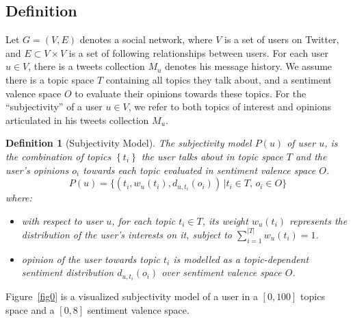 \documentclass[letterpaper]{article}
\newtheorem{definition}{Definition}
\begin{document}
\subsection{Definition}
\label{definition}

Let $G=\left( V,E \right) $ denotes a social network, where $ V $ is a set of users on Twitter, and $ E\subset V\times V $ is a set of following relationships between users. For each user $ u \in V $, there is a tweets collection $ M_{u} $ denotes his message history. We assume there is a topic space $ T $ containing all topics they talk about, and a sentiment valence space $ O $ to evaluate their opinions towards these topics. 
For the ``subjectivity'' of a user $ u  \in V $, we refer to both topics of interest and opinions articulated in his tweets collection $ M_{u} $.  
\begin{definition}[Subjectivity Model]
The subjectivity model $ P \left( u \right) $ of user $ u $, is the combination of topics $\left\lbrace  t_{i} \right\rbrace $ the user talks about in topic space $T$ and the user's opinions ${o_{i}}$ towards each topic evaluated in sentiment valence space $ O $. 
\begin{equation}
\label{usermodel}
P \left( u \right) = \lbrace \left( t_{i}, w_{u} \left( t_{i} \right), d_{u,t_{i}} \left( o_{i} \right) \right) \,\vert  t_{i} \in T, \, o_{i} \in O \rbrace
\end{equation}
where:
\begin{itemize}
\item with respect to user $ u $, for each topic $t_{i} \in T$, its weight $ w_{u} \left( t_{i} \right)$ represents the distribution of the user's interests on it, subject to $ \sum_{i=1}^{|T|}w_{u} \left( t_{i} \right)=1 $.
\item opinion of the user towards topic $t_{i}$ is modelled as a topic-dependent sentiment distribution  $d_{u,t_{i}} \left( o_{i} \right)$ over sentiment valence space $ O $.
\end{itemize}
\end{definition}
Figure~\ref{fig0} is a visualized subjectivity model of a user in a $ [0,100] $ topics space and a $ [0,8] $ sentiment valence space. 
\end{document}
